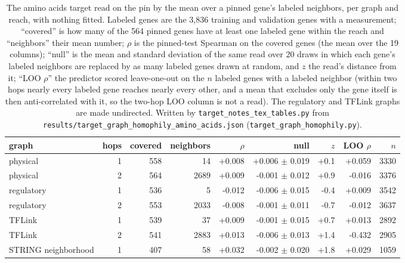 \begin{table}[H]
  \centering
  \footnotesize
  \caption[Label propagation of amino acids on the graphs]{The amino acids target read on the pin by the mean over a pinned gene's labeled neighbors, per graph and reach, with nothing fitted. Labeled genes are the 3,836 training and validation genes with a measurement; ``covered'' is how many of the 564 pinned genes have at least one labeled gene within the reach and ``neighbors'' their mean number; $\rho$ is the pinned-test Spearman on the covered genes (the mean over the 19 columns); ``null'' is the mean and standard deviation of the same read over 20 draws in which each gene's labeled neighbors are replaced by as many labeled genes drawn at random, and $z$ the read's distance from it; ``LOO $\rho$'' the predictor scored leave-one-out on the $n$ labeled genes with a labeled neighbor (within two hops nearly every labeled gene reaches nearly every other, and a mean that excludes only the gene itself is then anti-correlated with it, so the two-hop LOO column is not a read). The regulatory and TFLink graphs are made undirected. Written by \texttt{target\_notes\_tex\_tables.py} from \texttt{results/target\_graph\_homophily\_amino\_acids.json} (\texttt{target\_graph\_homophily.py}).}
  \label{tab:graph-homophily-amino-acids}
  \begin{tabular}{@{}lrrrrrrrr@{}}
    \hline
    graph & hops & covered & neighbors & $\rho$ & null & $z$ & LOO $\rho$ & $n$ \\
    \hline
    physical & 1 & 558 & 14 & +0.008 & +0.006 $\pm$ 0.019 & +0.1 & +0.059 & 3330 \\
    physical & 2 & 564 & 2689 & +0.009 & -0.001 $\pm$ 0.012 & +0.9 & -0.016 & 3376 \\
    regulatory & 1 & 536 & 5 & -0.012 & -0.006 $\pm$ 0.015 & -0.4 & +0.009 & 3542 \\
    regulatory & 2 & 553 & 2033 & -0.008 & -0.001 $\pm$ 0.011 & -0.7 & -0.012 & 3637 \\
    TFLink & 1 & 539 & 37 & +0.009 & -0.001 $\pm$ 0.015 & +0.7 & +0.013 & 2892 \\
    TFLink & 2 & 541 & 2883 & +0.013 & -0.006 $\pm$ 0.013 & +1.4 & -0.432 & 2905 \\
    STRING neighborhood & 1 & 407 & 58 & +0.032 & -0.002 $\pm$ 0.020 & +1.8 & +0.029 & 1059 \\

\end{tabular}
\end{table}
